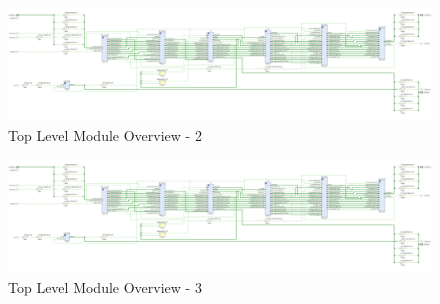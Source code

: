 \documentclass[a4paper]{report}
\begin{document}
\begin{figure}
  \ContinuedFloat
  \centering
  \includegraphics*[viewport={950 0 1900 600}, width=0.95\textheight, height=\textwidth, keepaspectratio, angle=270]{imgs/top-level-module.png}
  \caption{Top Level Module Overview - 2}
  \label{fig:top-level-design}
\end{figure}
\begin{figure}
  \ContinuedFloat
  \centering
  \includegraphics*[viewport={1900 0 2850 600}, width=0.95\textheight, height=\textwidth, keepaspectratio, angle=270]{imgs/top-level-module.png}
  \caption{Top Level Module Overview - 3}
  \label{fig:top-level-design}
\end{figure}
\end{document}
